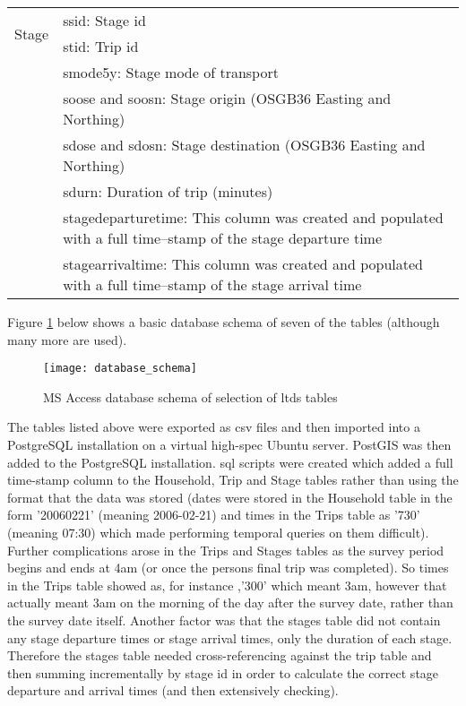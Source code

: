 \begin{center}
\begin{table}[h!]
\begin{tabular}{ | p{2.2cm} | p{12cm} |}
    \multirow{2}{*}{Stage} & ssid: Stage id \\
     & stid: Trip id \\
     & smode5y: Stage mode of transport \\
     & soose and soosn: Stage origin (OSGB36 Easting and Northing) \\
     & sdose and sdosn: Stage destination (OSGB36 Easting and Northing) \\
     & sdurn: Duration of trip (minutes) \\
     & stagedeparturetime: This column was created and populated with a full time--stamp of the stage departure time \\
     & stagearrivaltime: This column was created and populated with a full time--stamp of the stage arrival time \\ \hline
    \end{tabular}
    \label{tab:key_ltds_fields}
\end{table}
\end{center}

Figure \ref{fig:database_schema} below shows a basic database schema of seven of the tables (although many more are used).

\begin{figure}[H]
\centering
\texttt{[image: database\_schema]}
\caption{MS Access database schema of selection of \gls{ltds} tables}
\label{fig:database_schema}
\end{figure}

The tables listed above were exported as \gls{csv} files and then imported into a PostgreSQL installation on a virtual high-spec Ubuntu server. PostGIS was then added to the PostgreSQL installation. \gls{sql} scripts were created which added a full time-stamp column to the Household, Trip and Stage tables rather than using the format that the data was stored (dates were stored in the Household table in the form '20060221' (meaning 2006-02-21) and times in the Trips table as '730' (meaning 07:30) which made performing temporal queries on them difficult). Further complications arose in the Trips and Stages tables as the survey period begins and ends at 4am (or once the persons final trip was completed). So times in the Trips table showed as, for instance ,'300' which meant 3am, however that actually meant 3am on the morning of the day after the survey date, rather than the survey date itself. Another factor was that the stages table did not contain any stage departure times or stage arrival times, only the duration of each stage. Therefore the stages table needed cross-referencing against the trip table and then summing incrementally by stage id in order to calculate the correct stage departure and arrival times (and then extensively checking).

